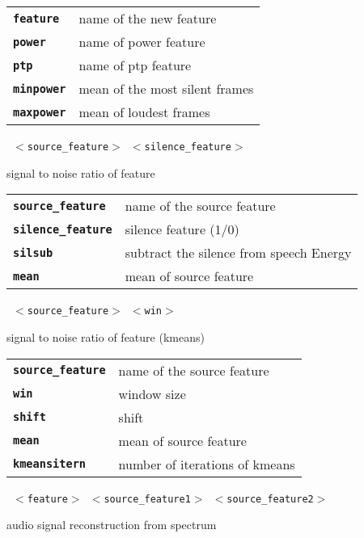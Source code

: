 \begin{description}
\begin{description}
      \begin{tabular}{ll}
 \texttt{\textbf{feature}} &  name of the new feature \\
 \texttt{\textbf{power}} &    name of power feature \\
 \texttt{\textbf{ptp}} &      name of ptp feature \\
 \texttt{\textbf{minpower}} &  mean of the most silent frames  \\
 \texttt{\textbf{maxpower}} &  mean of loudest frames  \\
      \end{tabular}
       \texttt{ $<$source\_feature$>$ $<$silence\_feature$>$  } \

        signal to noise ratio of feature

      \begin{tabular}{ll}
 \texttt{\textbf{source\_feature}} &   name of the source feature \\
 \texttt{\textbf{silence\_feature}} &  silence feature (1/0) \\
 \texttt{\textbf{silsub}} &            subtract the silence from speech Energy  \\
 \texttt{\textbf{mean}} &              mean of source feature  \\
      \end{tabular}
       \texttt{ $<$source\_feature$>$ $<$win$>$   } \

        signal to noise ratio of feature (kmeans)

      \begin{tabular}{ll}
 \texttt{\textbf{source\_feature}} &  name of the source feature \\
 \texttt{\textbf{win}} &             window size  \\
 \texttt{\textbf{shift}} &            shift  \\
 \texttt{\textbf{mean}} &             mean of source feature  \\
 \texttt{\textbf{kmeansitern}} &      number of iterations of kmeans  \\
      \end{tabular}
       \texttt{ $<$feature$>$ $<$source\_feature1$>$ $<$source\_feature2$>$   } \

        audio signal reconstruction from spectrum


\end{description}
\end{description}
